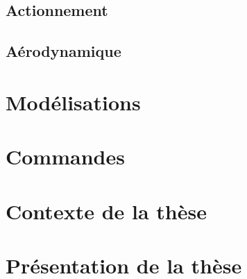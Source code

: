     \subsection{Actionnement}
    \subsection{Aérodynamique}

\section{Modélisations}

\section{Commandes}

\section{Contexte de la thèse}
\section{Présentation de la thèse}



